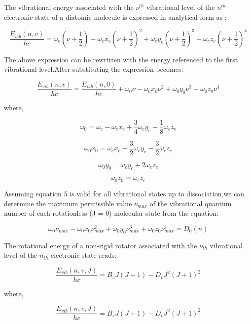 \documentclass[]{aelab_aiaa-tc}%
\begin{document}
The vibrational energy associated with the $\nu^{th}$ vibrational level of the $n^{th}$ electronic state of a diatomic molecule is expressed in analytical form as :


\begin{equation}
\frac{ E_{vib}(n,v)}{hc} = \omega_{e}\left(\nu + \frac{1}{2}\right) - \omega_{e}x_{e}\left(\nu + \frac{1}{2}\right)^2 + \omega_{e}y_{e}\left(\nu + \frac{1}{2}\right)^3 + \omega_{e}z_{e}\left(\nu + \frac{1}{2}\right)^4 
\end{equation}

The above expression can be rewritten with the energy referenced to the first vibrational level.After substituting the expression becomes:


\begin{equation}
\frac{ E_{vib}(n,v)}{hc} = \frac{ E_{vib}(n,0)}{hc} + \omega_{0}\nu - \omega_{0}x_{0}\nu^2 + \omega_{0}y_{0}\nu^3 + \omega_{0}z_{0}\nu^4
\end{equation}
 
 where,
 
$$\omega_{0} = \omega_{e} - \omega_{e}x_{e} + \frac{3}{4}\omega_{e}y_{e} + \frac{1}{8}\omega_{e}z_{e}$$

$$\omega_{0}x_{0} = \omega_{e}x_{e} - \frac{3}{2}\omega_{e}y_{e} - \frac{3}{2}\omega_{e}z_{e}$$

$$\omega_{0}y_{0} = \omega_{e}y_{e} + 2\omega_{e}z_{e}$$

$$\omega_{0}z_{0} = \omega_{e}z_{e}$$


Assuming equation 5 is valid for all vibrational states up to dissociation,we can determine the maximum permissible value $\nu_{max}$ of the vibrational quantum number of each rotationless (J = 0) molecular state from the equation:


\begin{equation}
\omega_{0}\nu_{max} - \omega_{0}x_{0}\nu_{max}^2 + \omega_{0}y_{0}\nu_{max}^3 + \omega_{0}z_{0}\nu_{max}^4 = D_{0}(n)
\end{equation}

The rotational energy of a non-rigid rotator associated with the $\nu_{th}$ vibrational level of the $n_{th}$ electronic state reads:

\begin{equation}
\frac{E_{vib}(n,v,J)}{hc} = B_{v}J(J+1) - D_{v}J^2(J+1)^2
\end{equation}

where,

\begin{equation}
\frac{E_{vib}(n,v,J)}{hc} = B_{v}J(J+1) - D_{v}J^2(J+1)^2
\end{equation}
\end{document}
